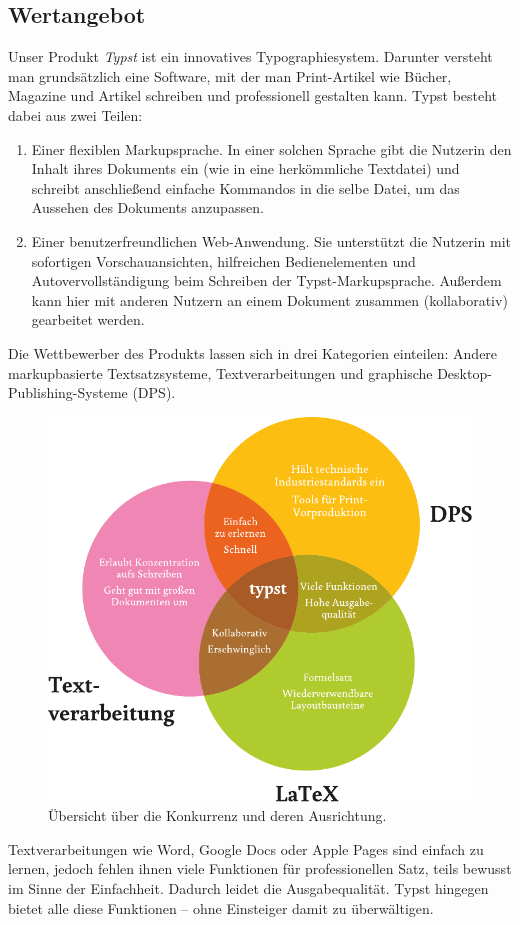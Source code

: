 \documentclass[11pt, a4paper]{article}
\newcommand{\gender}{\raisebox{-.25em}{*}}
\renewcommand{\glossary} {\marginsymbol{$\hookrightarrow$}}
\newcommand{\marginsymbol}[1] {\protect\marginsymbolhelper{#1}}
\newcommand{\marginsymbolhelper}[1] {\tabto*{-1cm}\makebox[0cm]{#1}\tabto*{\TabPrevPos}}
\begin{document}
\subsection*{Wertangebot}

Unser Produkt \emph{Typst} ist ein innovatives Typographiesystem. Darunter versteht man grundsätzlich eine Software, mit der man Print-Artikel wie Bücher, Magazine und Artikel schreiben und professionell gestalten kann. Typst besteht dabei aus zwei Teilen:

\begin{enumerate}
    \item Einer flexiblen \glossary Markupsprache. In einer solchen Sprache gibt die\gender{} Nutzer\gender{}in den Inhalt ihres\gender{} Dokuments ein (wie in eine herkömmliche Textdatei) und schreibt anschließend einfache Kommandos in die selbe Datei, um das Aussehen des Dokuments anzupassen.
    \item Einer benutzerfreundlichen Web-Anwendung. Sie unterstützt die\gender{} Nutzer\gender{}in mit sofortigen Vorschauansichten, hilfreichen Bedienelementen und Autovervollständigung beim Schreiben der Typst-Markupsprache. Außerdem kann hier mit anderen Nutzern an einem Dokument zusammen (kollaborativ) gearbeitet werden.
\end{enumerate}

Die Wettbewerber des Produkts lassen sich in drei Kategorien einteilen: Andere markupbasierte Textsatzsysteme, Textverarbeitungen und graphische Desktop-Publishing-Systeme (DPS).

\begin{figure}[h]
    \centering
    \includegraphics[width=.5\textwidth]{../assets/venn.pdf}
    \caption{Übersicht über die Konkurrenz und deren Ausrichtung.}
\end{figure}

Textverarbeitungen wie Word, Google Docs oder Apple Pages sind einfach zu lernen, jedoch fehlen ihnen viele Funktionen für professionellen Satz, teils bewusst im Sinne der Einfachheit. Dadurch leidet die Ausgabequalität. Typst hingegen bietet alle diese Funktionen -- ohne Einsteiger damit zu überwältigen.
\end{document}
